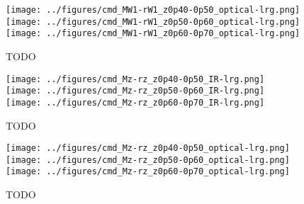 \documentclass[twocolumn,apj,iop,tighten]{emulateapj2}
\begin{document}
\begin{figure}
\centering
\texttt{[image: ../figures/cmd\_MW1-rW1\_z0p40-0p50\_optical-lrg.png]}
\\
\texttt{[image: ../figures/cmd\_MW1-rW1\_z0p50-0p60\_optical-lrg.png]}
\\
\texttt{[image: ../figures/cmd\_MW1-rW1\_z0p60-0p70\_optical-lrg.png]}
\caption{TODO
}
\label{fig:}
\end{figure}


\begin{figure}
\centering
\texttt{[image: ../figures/cmd\_Mz-rz\_z0p40-0p50\_IR-lrg.png]}
\\
\texttt{[image: ../figures/cmd\_Mz-rz\_z0p50-0p60\_IR-lrg.png]}
\\
\texttt{[image: ../figures/cmd\_Mz-rz\_z0p60-0p70\_IR-lrg.png]}
\caption{TODO
}
\label{fig:}
\end{figure}


\begin{figure}
\centering
\texttt{[image: ../figures/cmd\_Mz-rz\_z0p40-0p50\_optical-lrg.png]}
\\
\texttt{[image: ../figures/cmd\_Mz-rz\_z0p50-0p60\_optical-lrg.png]}
\\
\texttt{[image: ../figures/cmd\_Mz-rz\_z0p60-0p70\_optical-lrg.png]}
\caption{TODO
}
\label{fig:}
\end{figure}
\end{document}
